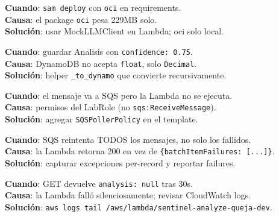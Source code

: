 \documentclass[11pt,a4paper,oneside]{article}
\begin{document}
\begin{tcolorbox}[colback=errred!5!white,colframe=errred,breakable,title={Error 1: Unzipped size > 250MB}]
\textbf{Cuando}: \texttt{sam deploy} con \texttt{oci} en requirements. \\
\textbf{Causa}: el package \texttt{oci} pesa 229MB solo. \\
\textbf{Soluci\'on}: usar MockLLMClient en Lambda; oci solo local.
\end{tcolorbox}

\begin{tcolorbox}[colback=errred!5!white,colframe=errred,breakable,title={Error 2: Float types not supported}]
\textbf{Cuando}: guardar Analisis con \texttt{confidence: 0.75}. \\
\textbf{Causa}: DynamoDB no acepta \texttt{float}, solo \texttt{Decimal}. \\
\textbf{Soluci\'on}: helper \texttt{\_to\_dynamo} que convierte recursivamente.
\end{tcolorbox}

\begin{tcolorbox}[colback=errred!5!white,colframe=errred,breakable,title={Error 3: SQS message sent but consumer no triggered}]
\textbf{Cuando}: el mensaje va a SQS pero la Lambda no se ejecuta. \\
\textbf{Causa}: permisos del LabRole (no \texttt{sqs:ReceiveMessage}). \\
\textbf{Soluci\'on}: agregar \texttt{SQSPollerPolicy} en el template.
\end{tcolorbox}

\begin{tcolorbox}[colback=errred!5!white,colframe=errred,breakable,title={Error 4: batchItemFailures no reportado}]
\textbf{Cuando}: SQS reintenta TODOS los mensajes, no solo los fallidos. \\
\textbf{Causa}: la Lambda retorna 200 en vez de \texttt{\{batchItemFailures: [...]\}}. \\
\textbf{Soluci\'on}: capturar excepciones per-record y reportar failures.
\end{tcolorbox}

\begin{tcolorbox}[colback=errred!5!white,colframe=errred,breakable,title={Error 5: analysis en null despu\'es de esperar}]
\textbf{Cuando}: GET devuelve \texttt{analysis: null} tras 30s. \\
\textbf{Causa}: la Lambda fall\'o silenciosamente; revisar CloudWatch logs. \\
\textbf{Soluci\'on}: \texttt{aws logs tail /aws/lambda/sentinel-analyze-queja-dev}.
\end{tcolorbox}
\end{document}
